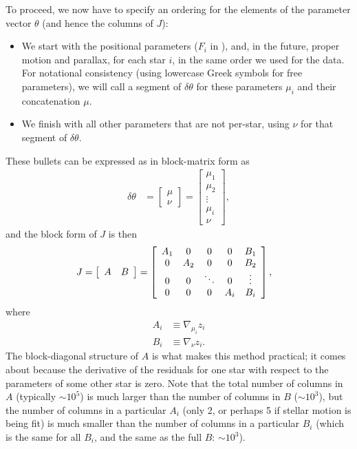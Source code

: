 To proceed, we now have to specify an ordering for the elements of the parameter vector $\theta$ (and hence the columns of $J$):
\begin{itemize}
    \item We start with the positional parameters ($F_i$ in ), and, in the future, proper motion and parallax, for each star $i$, in the same order we used for the data.
    For notational consistency (using lowercase Greek symbols for free parameters), we will call a segment of $\delta\theta$ for these parameters $\mu_i$ and their concatenation $\mu$.
    \item We finish with all other parameters that are not per-star, using $\nu$ for that segment of $\delta\theta$.
\end{itemize}

These bullets can be expressed as in block-matrix form as
\begin{align}
    \delta\theta &= \left[
        \begin{array}{ c }
            \mu \\
            \nu
        \end{array}
    \right]
    =
    \left[
        \begin{array}{ c }
            \mu_1 \\
            \mu_2 \\
            \vdots \\
            \mu_i \\
            \nu
        \end{array}
    \right],
\end{align}
and the block form of $J$ is then
\begin{align}
    J &= \left[
        \begin{array}{ c c }
            A & B
        \end{array}
    \right]
    = \left[
        \begin{array}{ c c c c c }
            A_1 & 0 & 0 & 0 & B_1 \\
            0 & A_2 & 0 & 0 & B_2 \\
            0 & 0 & \ddots & 0 & \vdots \\
            0 & 0 & 0 & A_i & B_i
        \end{array}
    \right],
\end{align}
where
\begin{align}
    A_i &\equiv \nabla_{\mu_i} z_i \\
    B_i &\equiv \nabla_{\nu} z_i.
\end{align}
The block-diagonal structure of $A$ is what makes this method practical; it comes about because the derivative of the residuals for one star with respect to the parameters of some other star is zero.
Note that the total number of columns in $A$ (typically $\sim 10^5$) is much larger than the number of columns in $B$ ($\sim 10^3$), but the number of columns in a particular $A_i$ (only 2, or perhaps 5 if stellar motion is being fit) is much smaller than the number of columns in a particular $B_i$ (which is the same for all $B_i$, and the same as the full $B$: $\sim 10^3$).

